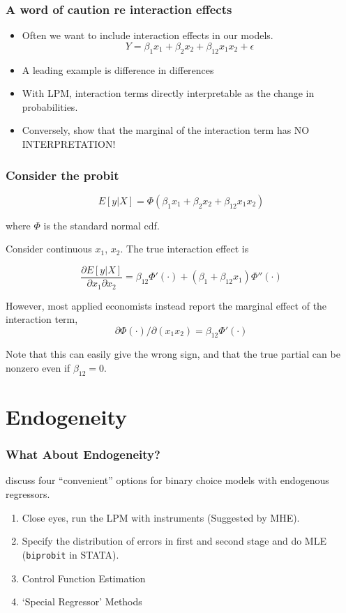 \begin{frame}
       \frametitle{A word of caution re interaction effects}
       \begin{itemize}
       \item Often we want to include interaction effects in our models. 
       $$ Y = \beta_1 x_1 + \beta_2 x_2 + \beta_{12}x_1x_2 + \epsilon $$ 
       \item A leading example is difference in differences 
       \item With LPM, interaction terms directly interpretable as the change in probabilities. 
       \item Conversely, \citet{ai2003interaction} show that the marginal of the interaction term has NO INTERPRETATION!
       \end{itemize}
\end{frame}


\begin{frame}
       \frametitle{Consider the probit}

       $$E[y|X] = \Phi(\beta_1 x_1 + \beta_2 x_2 + \beta_{12}x_1x_2) $$ 

       where $\Phi$ is the standard normal cdf. 

       \medskip

       Consider continuous $x_1$, $x_2$. The true interaction effect is 

       $$ \frac{\partial E[y|X]}{\partial x_1 \partial x_2} = 
              \beta_{12}\Phi'(\cdot) + (\beta_1 + \beta_{12}x_1)\Phi''(\cdot) $$ 

       \pause 
       However, most applied economists instead report the marginal effect of the interaction term, 
       $$\partial \Phi (\cdot)/ \partial (x_1 x_2) = \beta_{12} \Phi'(\cdot) $$

       Note that this can easily give the wrong sign, and that the true partial can be nonzero even if $\beta_{12} = 0$. 

\end{frame}

\section{Endogeneity}

\begin{frame}
\frametitle{What About Endogeneity?}

\cite{lewbel2012comparing} discuss four ``convenient'' options for binary choice models with endogenous regressors.
\begin{enumerate}
\item Close eyes, run the LPM with instruments (Suggested by MHE).
\item Specify the distribution of errors in first and second stage and do MLE (\texttt{biprobit} in STATA).
\item Control Function Estimation
\item `Special Regressor' Methods
\end{enumerate}
\end{frame}

